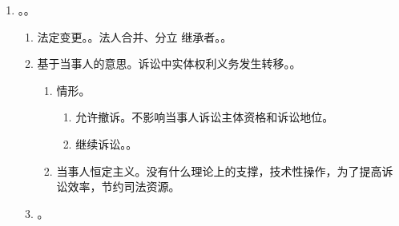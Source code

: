 \begin{enumerate}
\begin{enumerate}
                \begin{kk}{赔偿义务人}
                  \begin{enumerate}
                    \item 直接规定 A 担责，A 为被告。
                    \item A、B 连带责任，被告有选择权，一起告则列为共同被告。。
                          例外。。
                    \item A 担责，B 过错/管理职责承担相应、补充责任。B 是否作为共同被告看权利人主张。
                  \end{enumerate}
                \end{kk}
        \end{enumerate}
  \item {}。。
        \begin{enumerate}
          \item 法定变更。\yi {}。\er 法人合并、分立 \yjt 继承者。。
          \item 基于当事人的意思。诉讼中实体权利义务发生转移。。
                \begin{enumerate}
                  \item 情形。
                        \begin{enumerate}
                          \item 允许撤诉。不影响当事人诉讼主体资格和诉讼地位。
                          \item 继续诉讼。。
                        \end{enumerate}
                  \item 当事人恒定主义。没有什么理论上的支撑，技术性操作，为了提高诉讼效率，节约司法资源。
                \end{enumerate}
          \item {}。
        \end{enumerate}
\end{enumerate}
